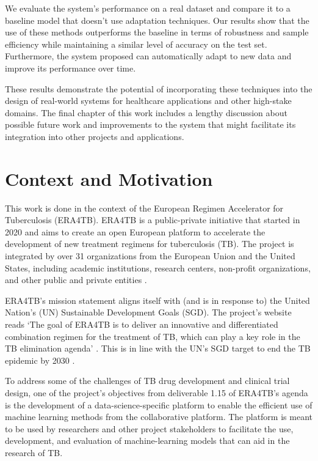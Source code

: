 \documentclass[../main.tex]{subfiles}
\begin{document}
 We evaluate the system's performance on a real dataset and compare it to a baseline model that doesn't use adaptation techniques.  Our results show that the use of these methods outperforms the baseline in terms of robustness and sample efficiency while maintaining a similar level of accuracy on the test set. Furthermore, the system proposed can automatically adapt to new data and improve its performance over time. 
 
 These results demonstrate the potential of incorporating these techniques into the design of real-world systems for healthcare applications and other high-stake domains. The final chapter of this work includes a lengthy discussion about possible future work and improvements to the system that might facilitate its integration into other projects and applications.
    
 \section{Context and Motivation} \label{sec:motivation}

    This work is done in the context of the European Regimen Accelerator for Tuberculosis (ERA4TB). ERA4TB is a public-private initiative that started in 2020 and aims to create an open European platform to accelerate the development of new treatment regimens for tuberculosis (TB). The project is integrated by over 31 organizations from the European Union and the United States, including academic institutions, research centers, non-profit organizations, and other public and private entities \cite{noauthor_era4tb}.
    
    ERA4TB's mission statement aligns itself with (and is in response to) the United Nation's (UN) Sustainable Development Goals (SGD). The project's website reads `The goal of ERA4TB is to deliver an innovative and differentiated combination regimen for the treatment of TB, which can play a key role in the TB elimination agenda' \cite{noauthor_era4tb}. This is in line with the UN's SGD target to end the TB epidemic by 2030 \cite{world_health_organization_regional_office_for_europe_tuberculosis_2017}.

    To address some of the challenges of TB drug development and clinical trial design, one of the project's objectives from deliverable 1.15 of ERA4TB's agenda is the development of a data-science-specific platform to enable the efficient use of machine learning methods from the collaborative platform. The platform is meant to be used by researchers and other project stakeholders to facilitate the use, development, and evaluation of machine-learning models that can aid in the research of TB.
\end{document}
